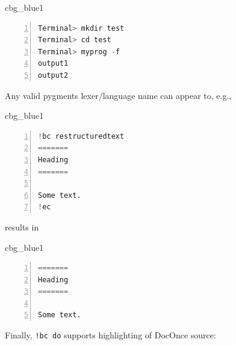 \n\documentclass[%
oneside,                 %
final,                   %
10pt]{article}
\newenvironment{_cod_tight}[1]{
   \def\FrameCommand{\colorbox{#1}}
   \FrameRule0.6pt\MakeFramed {\FrameRestore}\vskip3mm}
   {\vskip0mm\endMakeFramed}
\newenvironment{cod}[1]{
\bgroup\rmfamily
\fboxsep=0mm\relax
\begin{_cod_tight}{#1}
\list{}{\parsep=-2mm\parskip=0mm\topsep=0pt\leftmargin=2mm
\rightmargin=2\leftmargin\leftmargin=4pt\relax}
\item\relax}
{\endlist\end{_cod_tight}\egroup}
\theoremstyle{definition}
\begin{document}
\begin{cod}{cbg_blue1}\begin{lstlisting}[language=Python,style=myspeciallststyle,numbers=left,numberstyle=\tiny,stepnumber=3,numbersep=15pt,xleftmargin=1mm]
Terminal> mkdir test
Terminal> cd test
Terminal> myprog -f
output1
output2

\end{lstlisting}\end{cod}
\noindent


Any valid pygments lexer/language name can appear to, e.g.,









\begin{cod}{cbg_blue1}\begin{lstlisting}[language=Python,style=myspeciallststyle,numbers=left,numberstyle=\tiny,stepnumber=3,numbersep=15pt,xleftmargin=1mm]
!bc restructuredtext
=======
Heading
=======

Some text.
!ec

\end{lstlisting}\end{cod}
\noindent

results in







\begin{cod}{cbg_blue1}\begin{lstlisting}[language=Python,style=myspeciallststyle,numbers=left,numberstyle=\tiny,stepnumber=3,numbersep=15pt,xleftmargin=1mm]
=======
Heading
=======

Some text.

\end{lstlisting}\end{cod}
\noindent





















Finally, \Verb?!bc do? supports highlighting of DocOnce source:
\end{document}
